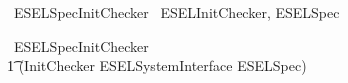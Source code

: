 \begin{zsection}
	\SECTION\ ESELSpecInitChecker \parents\ ESELInitChecker, ESELSpec
\end{zsection}

\begin{circus}
    \circprocess\ ESELSpecInitChecker \circdef \\
        \t1 (InitChecker \lpar ESELSystemInterface \rpar ESELSpec) \\
\end{circus}
